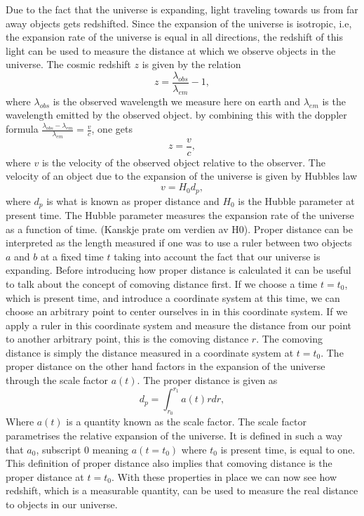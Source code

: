 Due to the fact that the universe is expanding, light traveling towards us from
far away objects gets redshifted. Since the expansion of the universe is
isotropic, i.e, the expansion rate of the universe is equal in all directions,
the redshift of this light can be used to measure the distance at which we
observe objects in the universe. The cosmic redshift $z$ is given by the
relation
\begin{equation}
    z = \frac{\lambda_{obs}}{\lambda_{em}} - 1,
\end{equation}
where $\lambda_{obs}$ is the observed wavelength we measure here on earth and
$\lambda_{em}$ is the wavelength emitted by the observed object. by combining this with the doppler formula
$\frac{\lambda_{obs}-\lambda_{em}}{\lambda_{em}} = \frac{v}{c}$, one gets
\begin{equation}
    z = \frac{v}{c},
\end{equation}
where $v$ is the velocity of the observed object relative to the observer. The
velocity of an object due to the expansion of the universe is given by Hubbles law
\begin{equation}
    v = H_0 d_p,
\end{equation}
where $d_p$ is what is known as proper distance and $H_0$ is the Hubble
parameter at present time. The Hubble parameter measures the expansion rate of
the universe as a function of time. (Kanskje prate om verdien av H0). Proper distance can be interpreted as the length measured if one
was to use a ruler between two objects $a$ and $b$ at a fixed time $t$ taking
into account the fact that our universe is expanding. Before introducing how proper distance is calculated it can be
useful to talk about the concept of comoving distance first. If we choose a time
$t=t_0$, which is present time, and introduce a coordinate system at this time,
we can choose an arbitrary point to center ourselves in in this coordinate
system. If we apply a ruler in this coordinate system and measure the distance
from our point to another arbitrary point, this is the comoving distance $r$. The
comoving distance is simply the distance measured in a coordinate system at
$t=t_0$. The proper distance on the other hand factors in the expansion of the
universe through the scale factor $a(t)$. The proper distance is given as
\begin{equation}
    d_p = \int_{r_0}^{r_1}a(t)rdr,
\end{equation}
Where $a(t)$ is a quantity known as the scale factor. The scale factor parametrises the relative expansion of the
universe. It is defined in such a way that $a_0$, subscript $0$ meaning
$a(t=t_0)$ where $t_0$ is present time, is equal to one. This definition of
proper distance also implies that comoving distance is the proper distance at $t=t_0$.
With these properties in place we can now see how redshift, which is a
measurable quantity, can be used to measure the real distance to objects in our universe.\\

